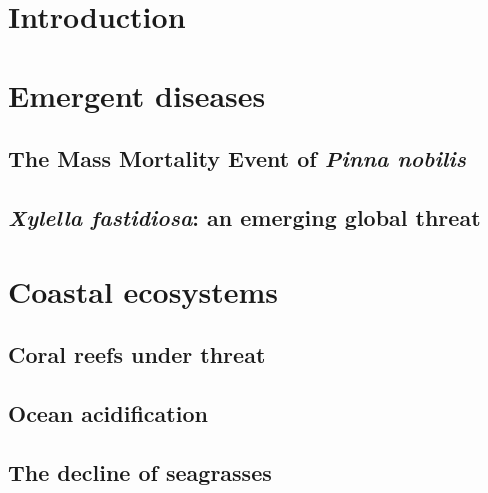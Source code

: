 \setcounter{page}{0}

\section{\label{sec:Introduction_1} Introduction}

\section{\label{sec:Emergent diseases} Emergent diseases}

\subsection{\label{sec:The Mass Mortality Event of Pinna nobilis} The Mass
  Mortality Event of \textit{Pinna nobilis}}

\subsection{\label{sec:Xylella fastidiosa: an emerging global
    threat}\textit{Xylella
    fastidiosa}: an emerging global threat}

\section{\label{sec:Coastal ecosystems} Coastal ecosystems}

\subsection{\label{sec:Coral reefs under threat} Coral reefs under threat}

\subsection{\label{sec:Ocean acidification} Ocean acidification}

\subsection{\label{sec:The decline of seagrasses} The decline of seagrasses}